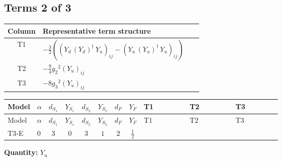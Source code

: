 \documentclass[8pt]{article}
\begin{document}
\begin{landscape}
\subsection*{Terms 2 of 3}
\begin{center}
\begin{tabular}{@{}c >{\raggedright\arraybackslash}p{0.82\linewidth}@{}}
\toprule
Column & Representative term structure \\
\midrule
T1 & \(\displaystyle -\frac{3}{2} (\left({Y_d}\,\left({Y_d}\right)^{\dagger}\,{Y_u}\right)_{ij}-\left({Y_u}\,\left({Y_u}\right)^{\dagger}\,{Y_u}\right)_{ij})\) \\
\midrule
T2 & \(\displaystyle -\frac{9}{4} {g_2}^2 \left({Y_u}\right)_{ij}\) \\
\midrule
T3 & \(\displaystyle -8 {g_3}^2 \left({Y_u}\right)_{ij}\) \\
\midrule
\bottomrule
\end{tabular}
\end{center}
\smallskip
\tiny
\begin{longtable}{@{}llcccccc >{\raggedright\arraybackslash}p{0.21\linewidth} >{\raggedright\arraybackslash}p{0.21\linewidth} >{\raggedright\arraybackslash}p{0.21\linewidth}@{}}
\toprule
Model & $\alpha$ & $d_{S_1}$ & $Y_{S_1}$ & $d_{S_2}$ & $Y_{S_2}$ & $d_F$ & $Y_F$ & T1 & T2 & T3 \\
\midrule
\endfirsthead
\toprule
Model & $\alpha$ & $d_{S_1}$ & $Y_{S_1}$ & $d_{S_2}$ & $Y_{S_2}$ & $d_F$ & $Y_F$ & T1 & T2 & T3 \\
\midrule
\endhead
T3-E & $0$ & $3$ & $0$ & $3$ & $1$ & $2$ & $\frac{1}{2}$ & \scriptsize\adjustbox{max width=\linewidth}{$\begin{gathered} -\frac{3}{2} (\left({Y_d}\,\left({Y_d}\right)^{\dagger}\,{Y_u}\right)_{ij}-\left({Y_u}\,\left({Y_u}\right)^{\dagger}\,{Y_u}\right)_{ij})\end{gathered}$} & \scriptsize\adjustbox{max width=\linewidth}{$\begin{gathered} -\frac{9}{4} {g_2}^2 \left({Y_u}\right)_{ij}\end{gathered}$} & \scriptsize\adjustbox{max width=\linewidth}{$\begin{gathered} -8 {g_3}^2 \left({Y_u}\right)_{ij}\end{gathered}$} \\
\midrule
\bottomrule
\end{longtable}
\clearpage
\noindent\textbf{Quantity: }$Y_u$\par\smallskip

\end{landscape}
\end{document}
